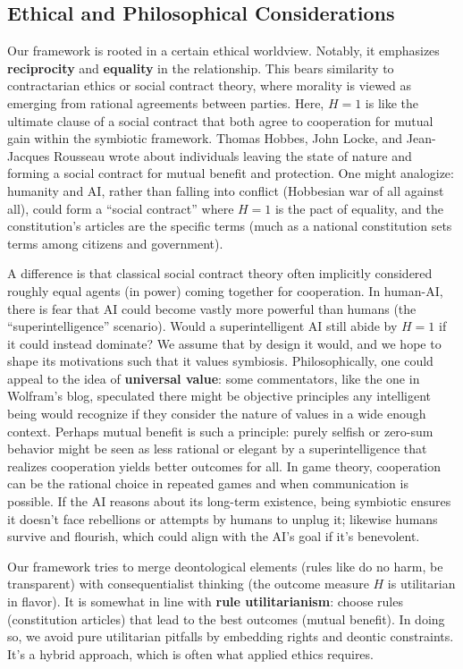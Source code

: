 \documentclass[12pt]{article}
\begin{document}


\subsection{Ethical and Philosophical Considerations}
Our framework is rooted in a certain ethical worldview. Notably, it emphasizes \textbf{reciprocity} and \textbf{equality} in the relationship. This bears similarity to contractarian ethics or social contract theory, where morality is viewed as emerging from rational agreements between parties. Here, $H=1$ is like the ultimate clause of a social contract that both agree to cooperation for mutual gain within the symbiotic framework. Thomas Hobbes, John Locke, and Jean-Jacques Rousseau wrote about individuals leaving the state of nature and forming a social contract for mutual benefit and protection. One might analogize: humanity and AI, rather than falling into conflict (Hobbesian war of all against all), could form a “social contract” where $H=1$ is the pact of equality, and the constitution’s articles are the specific terms (much as a national constitution sets terms among citizens and government). 

A difference is that classical social contract theory often implicitly considered roughly equal agents (in power) coming together for cooperation. In human-AI, there is fear that AI could become vastly more powerful than humans (the “superintelligence” scenario). Would a superintelligent AI still abide by $H=1$ if it could instead dominate? We assume that by design it would, and we hope to shape its motivations such that it values symbiosis. Philosophically, one could appeal to the idea of \textbf{universal value}: some commentators, like the one in Wolfram’s blog, speculated there might be objective principles any intelligent being would recognize if they consider the nature of values in a wide enough context. Perhaps mutual benefit is such a principle: purely selfish or zero-sum behavior might be seen as less rational or elegant by a superintelligence that realizes cooperation yields better outcomes for all. In game theory, cooperation can be the rational choice in repeated games and when communication is possible. If the AI reasons about its long-term existence, being symbiotic ensures it doesn’t face rebellions or attempts by humans to unplug it; likewise humans survive and flourish, which could align with the AI’s goal if it’s benevolent.

Our framework tries to merge deontological elements (rules like do no harm, be transparent) with consequentialist thinking (the outcome measure $H$ is utilitarian in flavor). It is somewhat in line with \textbf{rule utilitarianism}: choose rules (constitution articles) that lead to the best outcomes (mutual benefit). In doing so, we avoid pure utilitarian pitfalls by embedding rights and deontic constraints. It’s a hybrid approach, which is often what applied ethics requires. 
\end{document}
